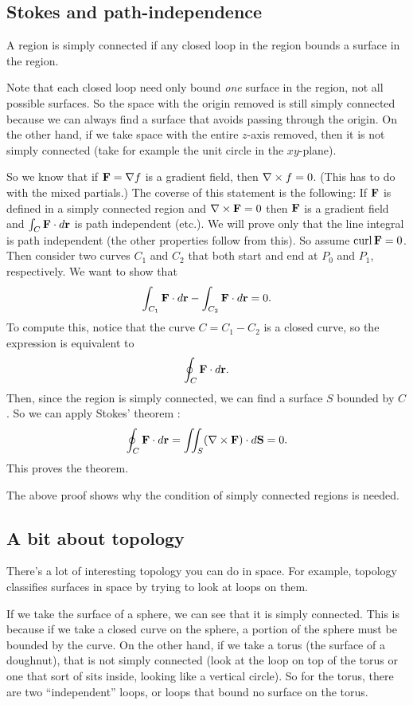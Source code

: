 \subsection{Stokes and path-independence}

\bdf
A region is simply connected if any closed loop in the region bounds a surface in the region. 
\edf

\brm
Note that each closed loop need only bound \textit{one} surface in the region, not all possible surfaces. So the space with the origin removed is still simply connected because we can always find a surface that avoids passing through the origin. On the other hand, if we take space with the entire $z$-axis removed, then it is not simply connected (take for example the unit circle in the $xy$-plane). 
\erm

So we know that if $\boldsymbol{\mathbf{F}} = \nabla f$ is a gradient field, then $\nabla \times f = 0$. (This has to do with the mixed partials.) The coverse of this statement is the following:
\btm
If $\boldsymbol{\mathbf{F}}$ is defined in a simply connected region and $\nabla \times \boldsymbol{\mathbf{F}} = 0$ then $\boldsymbol{\mathbf{F}}$ is a gradient field and $\int_C \boldsymbol{\mathbf{F}} \cdot d\boldsymbol{\mathbf{r}}$ is path independent (etc.).
\bpf
We will prove only that the line integral is path independent (the other properties follow from this). So assume $\mathrm{curl}\, \boldsymbol{\mathbf{F}} = 0$. Then consider two curves $C_1$ and $C_2$ that both start and end at $P_0$ and $P_1$, respectively. We want to show that
\[ \int_{C_1} \boldsymbol{\mathbf{F}} \cdot d\boldsymbol{\mathbf{r}} - \int_{C_2} \boldsymbol{\mathbf{F}} \cdot d\boldsymbol{\mathbf{r}} = 0. \]
To compute this, notice that the curve $C = C_1 - C_2$ is a closed curve, so the expression is equivalent to
\[ \oint_C \boldsymbol{\mathbf{F}} \cdot d\boldsymbol{\mathbf{r}}. \]
Then, since the region is simply connected, we can find a surface $S$ bounded by $C$. So we can apply Stokes' theorem :
\[ \oint_C \boldsymbol{\mathbf{F}} \cdot d\boldsymbol{\mathbf{r}} = \iint_S (\nabla \times \boldsymbol{\mathbf{F}})\cdot d\boldsymbol{\mathbf{S}} = 0. \]
This proves the theorem.
\epf
\etm

The above proof shows why the condition of simply connected regions is needed. 

\subsection{A bit about topology}

There's a lot of interesting topology you can do in space. For example, topology classifies surfaces in space by trying to look at loops on them. 

If we take the surface of a sphere, we can see that it is simply connected. This is because if we take a closed curve on the sphere, a portion of the sphere must be bounded by the curve. On the other hand, if we take a torus (the surface of a doughnut), that is not simply connected (look at the loop on top of the torus or one that sort of sits inside, looking like a vertical circle). So for the torus, there are two ``independent'' loops, or loops that bound no surface on the torus. 

